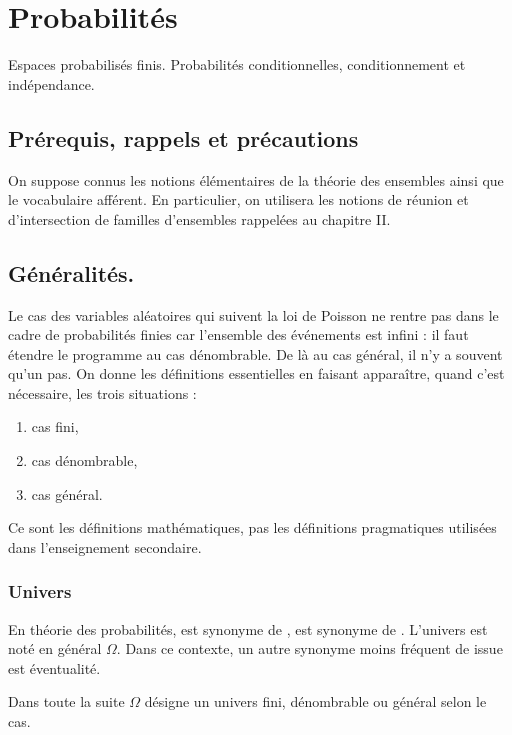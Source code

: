 
\section{Probabilités}
Espaces probabilisés finis. Probabilités conditionnelles, conditionnement et indépendance.
\subsection{Prérequis, rappels et précautions}
On suppose connus les notions élémentaires de la théorie des ensembles ainsi que le vocabulaire afférent. En
particulier, on utilisera les notions de réunion et d'intersection de familles d'ensembles rappelées au chapitre II.
\subsection{Généralités.}
Le cas des variables aléatoires qui suivent la loi de Poisson ne rentre pas dans le cadre de probabilités finies car
l'ensemble des événements est infini : il faut étendre le programme au cas dénombrable. De là au cas général, il n'y a
souvent qu'un pas. On donne les définitions essentielles en faisant apparaître, quand c'est nécessaire, les trois
situations :
\begin{enumerate}
\item cas fini,
\item cas dénombrable,
\item cas général.
\end{enumerate}
Ce sont les définitions mathématiques, pas les définitions pragmatiques utilisées dans l'enseignement secondaire.
\subsubsection{Univers}
\begin{terminology}
En théorie des probabilités,  est synonyme de ,
 est synonyme de . L'univers est noté en général \(Ω\).
Dans ce contexte, un autre synonyme moins fréquent de issue est éventualité.
\end{terminology}
Dans toute la suite \(Ω\) désigne un univers fini, dénombrable ou général selon le cas.
